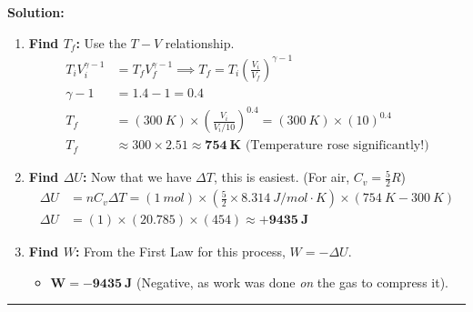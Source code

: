 \documentclass[article]{article}
\begin{document}
\textbf{Solution:}
\begin{enumerate}
    \item \textbf{Find $T_f$:} Use the $T-V$ relationship.
    \begin{align*}
        T_iV_i^{\gamma-1} &= T_fV_f^{\gamma-1} \implies T_f = T_i \left(\frac{V_i}{V_f}\right)^{\gamma-1} \\
        \gamma - 1 &= 1.4 - 1 = 0.4 \\
        T_f &= (\SI{300}{K}) \times \left(\frac{V_i}{V_i/10}\right)^{0.4} = (\SI{300}{K}) \times (10)^{0.4} \\
        T_f &\approx 300 \times 2.51 \approx \mathbf{\SI{754}{K}} \text{ (Temperature rose significantly!)}
    \end{align*}
    \item \textbf{Find $\Delta U$:} Now that we have $\Delta T$, this is easiest. (For air, $C_v = \frac{5}{2}R$)
    \begin{align*}
        \Delta U &= nC_v\Delta T = (\SI{1}{mol}) \times (\frac{5}{2} \times \SI{8.314}{J/mol\cdot K}) \times (\SI{754}{K} - \SI{300}{K}) \\
        \Delta U &= (1) \times (20.785) \times (454) \approx \mathbf{+\SI{9435}{J}}
    \end{align*}
    \item \textbf{Find $W$:} From the First Law for this process, $W = -\Delta U$.
    \begin{itemize}
        \item $\mathbf{W = -\SI{9435}{J}}$ (Negative, as work was done \textit{on} the gas to compress it).
    \end{itemize}
\end{enumerate}

\hrule
\end{document}
